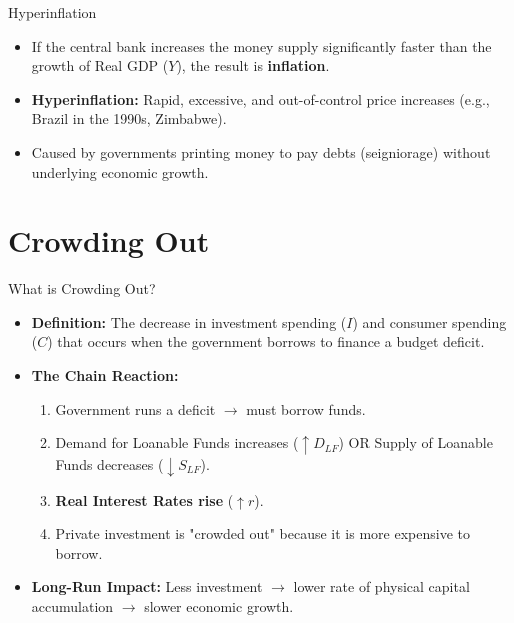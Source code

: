 \documentclass[aspectratio=169]{beamer}
\begin{document}
\begin{frame}{Hyperinflation}
    \begin{itemize}
        \item If the central bank increases the money supply significantly faster than the growth of Real GDP ($Y$), the result is \textbf{inflation}.
        \item \textbf{Hyperinflation:} Rapid, excessive, and out-of-control price increases (e.g., Brazil in the 1990s, Zimbabwe).
        \item Caused by governments printing money to pay debts (seigniorage) without underlying economic growth.
    \end{itemize}
\end{frame}

\section{Crowding Out}

\begin{frame}{What is Crowding Out?}
    \begin{itemize}
        \item \textbf{Definition:} The decrease in investment spending ($I$) and consumer spending ($C$) that occurs when the government borrows to finance a budget deficit.
        \item \textbf{The Chain Reaction:}
        \begin{enumerate}
            \item Government runs a deficit $\rightarrow$ must borrow funds.
            \item Demand for Loanable Funds increases ($\uparrow D_{LF}$) OR Supply of Loanable Funds decreases ($\downarrow S_{LF}$).
            \item \textbf{Real Interest Rates rise} ($\uparrow r$).
            \item Private investment is "crowded out" because it is more expensive to borrow.
        \end{enumerate}
        \item \textbf{Long-Run Impact:} Less investment $\rightarrow$ lower rate of physical capital accumulation $\rightarrow$ slower economic growth.
    \end{itemize}
\end{frame}
\end{document}
